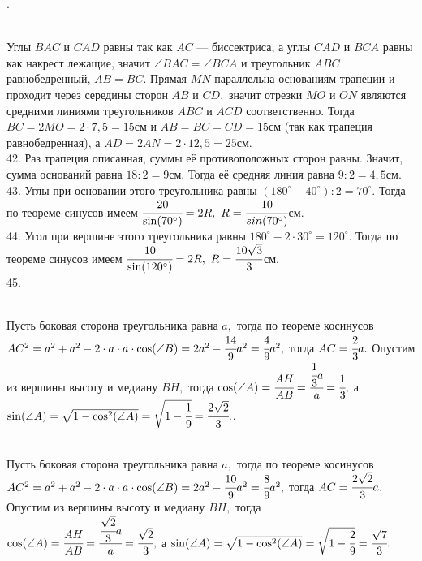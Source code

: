 . \begin{figure}[ht!]
\end{figure}\\
Углы $BAC$ и $CAD$ равны так как $AC$ --- биссектриса, а углы $CAD$ и $BCA$ равны как накрест лежащие, значит $\angle BAC=\angle BCA$ и треугольник $ABC$ равнобедренный, $AB=BC.$ Прямая $MN$ параллельна основаниям трапеции и проходит через середины сторон $AB$ и $CD,$ значит отрезки $MO$ и $ON$ являются средними линиями треугольников $ABC$ и $ACD$ соответственно. Тогда $BC=2MO=2\cdot7,5=15$см и $AB=BC=CD=15$см (так как трапеция равнобедренная), а $AD=2AN=2\cdot12,5=25$см.\\
42. Раз трапеция описанная, суммы её противоположных сторон равны. Значит, сумма оснований равна $18:2=9$см. Тогда её средняя линия равна $9:2=4,5$см.\\
43. Углы при основании этого треугольника равны $(180^\circ-40^\circ):2=70^\circ.$ Тогда по теореме синусов имеем $\cfrac{20}{\sin(70^\circ)}=2R,\ R=\cfrac{10}{sin(70^\circ)}$см.\\
44. Угол при вершине этого треугольника равны $180^\circ-2\cdot30^\circ=120^\circ.$ Тогда по теореме синусов имеем $\cfrac{10}{\sin(120^\circ)}=2R,\ R=\cfrac{10\sqrt{3}}{3}$см.\\
45. \begin{figure}[ht!]
\end{figure}\\
Пусть боковая сторона треугольника равна $a,$ тогда по теореме косинусов $AC^2=a^2+a^2-2\cdot a\cdot a\cdot \cos(\angle B)=2a^2-\cfrac{14}{9}a^2=\cfrac{4}{9}a^2,$
тогда $AC=\cfrac{2}{3}a.$ Опустим из вершины высоту и медиану $BH,$ тогда $\cos(\angle A)=\cfrac{AH}{AB}=\cfrac{\cfrac{1}{3}a}{a}=\cfrac{1}{3},$
а $\sin(\angle A)=\sqrt{1-\cos^2(\angle A)}=\sqrt{1-\cfrac{1}{9}}=\cfrac{2\sqrt{2}}{3}.$\newpage{}. \begin{figure}[ht!]
\end{figure}\\
Пусть боковая сторона треугольника равна $a,$ тогда по теореме косинусов $AC^2=a^2+a^2-2\cdot a\cdot a\cdot \cos(\angle B)=2a^2-\cfrac{10}{9}a^2=\cfrac{8}{9}a^2,$
тогда $AC=\cfrac{2\sqrt{2}}{3}a.$ Опустим из вершины высоту и медиану $BH,$ тогда $\cos(\angle A)=\cfrac{AH}{AB}=\cfrac{\cfrac{\sqrt{2}}{3}a}{a}=\cfrac{\sqrt{2}}{3},$
а $\sin(\angle A)=\sqrt{1-\cos^2(\angle A)}=\sqrt{1-\cfrac{2}{9}}=\cfrac{\sqrt{7}}{3}.$\\
